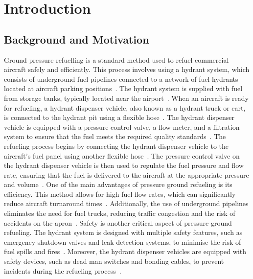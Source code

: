 \documentclass[12pt,oneside]{book} %
\begin{document}
%
%
\mainmatter\pagestyle{fancy}
\fancyhead[L]{\nouppercase{\leftmark}}
\fancyhead[R]{\nouppercase{\rightmark}}

\chapter{Introduction}
\section{Background and Motivation}

Ground pressure refuelling is a standard method used to refuel commercial
aircraft safely and efficiently. This process involves using a hydrant system,
which consists of underground fuel pipelines connected to a network of fuel
hydrants located at aircraft parking positions~\cite{blakey2011aviation}. The
hydrant system is supplied with fuel from storage tanks, typically located near
the airport~\cite{kazda2015airport}. When an aircraft is ready for refueling, a
hydrant dispenser vehicle, also known as a hydrant truck or cart, is connected
to the hydrant pit using a flexible hose~\cite{sati2019aircraft}. The hydrant
dispenser vehicle is equipped with a pressure control valve, a flow meter, and
a filtration system to ensure that the fuel meets the required quality
standards~\cite{iata2019guidance}. The refueling process begins by connecting
the hydrant dispenser vehicle to the aircraft's fuel panel using another
flexible hose~\cite{sati2019aircraft}. The pressure control valve on the
hydrant dispenser vehicle is then used to regulate the fuel pressure and flow
rate, ensuring that the fuel is delivered to the aircraft at the appropriate
pressure and volume~\cite{iata2019guidance}. One of the main advantages of
pressure ground refueling is its efficiency. This method allows for high fuel
flow rates, which can significantly reduce aircraft turnaround
times~\cite{blakey2011aviation}. Additionally, the use of underground pipelines
eliminates the need for fuel trucks, reducing traffic congestion and the risk
of accidents on the apron~\cite{kazda2015airport}. Safety is another critical
aspect of pressure ground refueling. The hydrant system is designed with
multiple safety features, such as emergency shutdown valves and leak detection
systems, to minimise the risk of fuel spills and fires~\cite{iata2019guidance}.
Moreover, the hydrant dispenser vehicles are equipped with safety devices, such
as dead man switches and bonding cables, to prevent incidents during the
refueling process~\cite{sati2019aircraft}.
\end{document}
